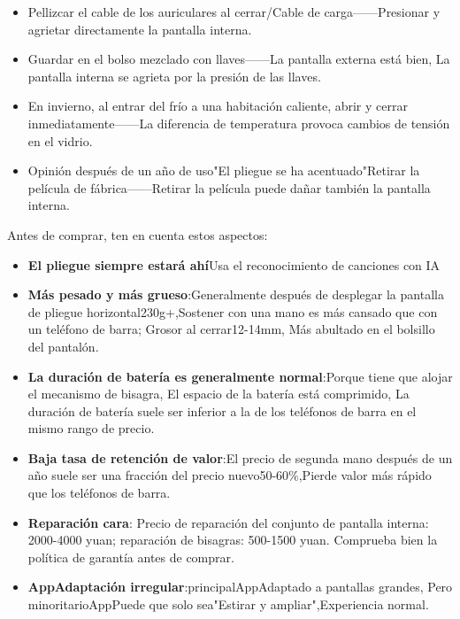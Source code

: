 \begin{itemize}
  \item Pellizcar el cable de los auriculares al cerrar/Cable de carga——Presionar y agrietar directamente la pantalla interna.
  \item Guardar en el bolso mezclado con llaves——La pantalla externa está bien, La pantalla interna se agrieta por la presión de las llaves.
  \item En invierno, al entrar del frío a una habitación caliente, abrir y cerrar inmediatamente——La diferencia de temperatura provoca cambios de tensión en el vidrio.
  \item Opinión después de un año de uso"El pliegue se ha acentuado"Retirar la película de fábrica——Retirar la película puede dañar también la pantalla interna.
\end{itemize}


Antes de comprar, ten en cuenta estos aspectos:

\begin{itemize}
  \item \textbf{El pliegue siempre estará ahí}Usa el reconocimiento de canciones con IA
  \item \textbf{Más pesado y más grueso}:Generalmente después de desplegar la pantalla de pliegue horizontal230g+,Sostener con una mano es más cansado que con un teléfono de barra; Grosor al cerrar12-14mm, Más abultado en el bolsillo del pantalón.
  \item \textbf{La duración de batería es generalmente normal}:Porque tiene que alojar el mecanismo de bisagra, El espacio de la batería está comprimido, La duración de batería suele ser inferior a la de los teléfonos de barra en el mismo rango de precio.
  \item \textbf{Baja tasa de retención de valor}:El precio de segunda mano después de un año suele ser una fracción del precio nuevo50-60\%,Pierde valor más rápido que los teléfonos de barra.
  \item \textbf{Reparación cara}: Precio de reparación del conjunto de pantalla interna: 2000-4000 yuan; reparación de bisagras: 500-1500 yuan. Comprueba bien la política de garantía antes de comprar.
  \item \textbf{AppAdaptación irregular}:principalAppAdaptado a pantallas grandes, Pero minoritarioAppPuede que solo sea"Estirar y ampliar",Experiencia normal.
\end{itemize}

